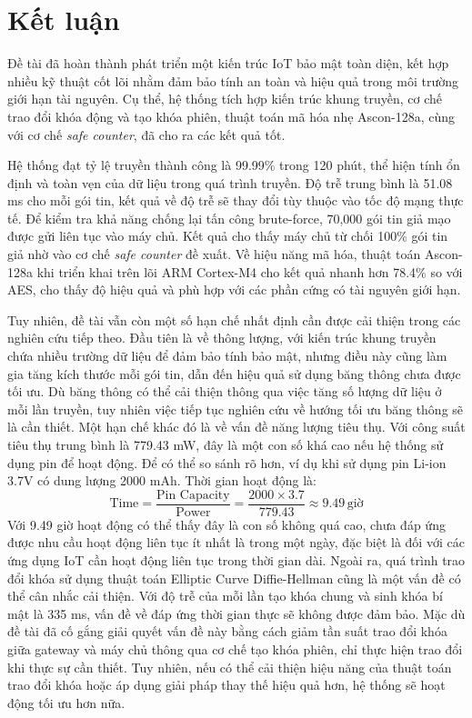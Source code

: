 \chapter{Kết luận}
\label{Chapter5}

Đề tài đã hoàn thành phát triển một kiến trúc IoT bảo mật toàn diện, kết hợp nhiều kỹ thuật cốt lõi nhằm đảm bảo tính an toàn và hiệu quả trong môi trường giới hạn tài nguyên. 
Cụ thể, hệ thống tích hợp kiến trúc khung truyền, cơ chế trao đổi khóa động và tạo khóa phiên, thuật toán mã hóa nhẹ Ascon-128a, cùng với cơ chế \textit{safe counter}, đã
cho ra các kết quả tốt. 

Hệ thống đạt tỷ lệ truyền thành công là 99.99\% trong 120 phút, thể hiện tính ổn định và toàn vẹn của dữ liệu trong quá trình truyền.
Độ trễ trung bình là 51.08 ms cho mỗi gói tin, kết quả về độ trễ sẽ thay đổi tùy thuộc vào tốc độ mạng thực tế. Để kiểm tra khả năng chống lại tấn công brute-force, 70,000
gói tin giả mạo được gửi liên tục vào máy chủ. Kết quả cho thấy máy chủ từ chối 100\% gói tin giả nhờ vào cơ chế \textit{safe counter} đề xuất. 
Về hiệu năng mã hóa, thuật toán Ascon-128a khi triển khai trên lõi ARM Cortex-M4 cho kết quả nhanh hơn 78.4\% so với AES, cho thấy độ hiệu quả 
và phù hợp với các phần cứng có tài nguyên giới hạn. 

Tuy nhiên, đề tài vẫn còn một số hạn chế nhất định cần được cải thiện trong các nghiên cứu tiếp theo. Đầu tiên là về thông lượng, với kiến trúc khung truyền chứa nhiều trường dữ liệu để đảm bảo tính bảo mật, nhưng điều này cũng làm gia tăng kích thước mỗi gói tin, dẫn đến hiệu quả sử dụng băng thông chưa được tối ưu. Dù băng thông có thể cải thiện thông qua việc tăng số lượng dữ liệu ở mỗi lần truyền, tuy nhiên việc tiếp tục nghiên cứu về hướng tối ưu băng thông sẽ là cần thiết.
Một hạn chế khác đó là về vấn đề năng lượng tiêu thụ. Với công suất tiêu thụ trung bình là 779.43 mW, đây là một con số khá cao nếu hệ thống sử dụng pin để hoạt động. Để có thể so sánh rõ hơn, ví dụ khi sử dụng pin Li-ion 3.7V 
có dung lượng 2000 mAh. Thời gian hoạt động là:
\[
    \text{Time} = \frac{\text{Pin Capacity}}{\text{Power}} = \frac{2000 \times 3.7 }{779.43} \approx 9.49 \, \text{giờ}
\]
Với 9.49 giờ hoạt động có thể thấy đây là con số không quá cao, chưa đáp ứng được nhu cầu hoạt động liên tục ít nhất là trong một ngày, đặc biệt là đối với các ứng dụng IoT cần hoạt động liên tục trong thời gian dài. Ngoài ra, quá trình trao đổi khóa sử dụng thuật toán
Elliptic Curve Diffie-Hellman cũng là một vấn đề có thể cân nhắc cải thiện. Với độ trễ của mỗi lần tạo khóa chung và sinh khóa bí mật là 335 ms, vấn đề về đáp ứng thời gian thực sẽ
không được đảm bảo. Mặc dù đề tài đã cố gắng giải quyết vấn đề này bằng cách giảm tần suất trao đổi khóa giữa gateway và máy chủ thông qua cơ chế tạo khóa phiên, chỉ thực hiện trao đổi khi thực sự cần thiết. Tuy nhiên, nếu có thể cải thiện hiệu năng của thuật toán trao đổi khóa hoặc áp dụng giải pháp thay thế hiệu quả hơn, hệ thống sẽ hoạt động tối ưu hơn nữa.


